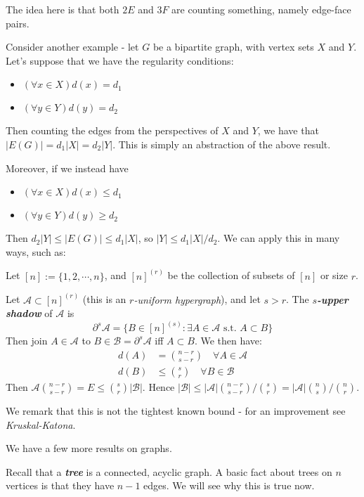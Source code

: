 \documentclass[]{article}
\theoremstyle{custhm}
\theoremstyle{cusdef}
\theoremstyle{custhm}
\theoremstyle{custhm}
\theoremstyle{custhm}
\theoremstyle{custhm}
\theoremstyle{cusdef}
\theoremstyle{remark}
\theoremstyle{custhm}
\newcommand{\undf}[1]{\textit{\textbf{#1}}}
\renewcommand{\it}[1]{\textit{#1}}
\begin{document}
The idea here is that both $2E$ and $3F$ are counting something, namely edge-face pairs.

Consider another example - let $G$ be a bipartite graph, with vertex sets $X$ and $Y$. Let's suppose that we have the regularity conditions:
\begin{itemize}
	\item $(\forall x\in X)d(x) = d_1$
	\item $(\forall y\in Y)d(y) = d_2$
\end{itemize}

Then counting the edges from the perspectives of $X$ and $Y$, we have that $|E(G)| = d_1|X| = d_2|Y|$. This is simply an abstraction of the above result.

Moreover, if we instead have
\begin{itemize}
	\item $(\forall x\in X)d(x) \le d_1$
	\item $(\forall y\in Y)d(y) \ge d_2$
\end{itemize}

Then $d_2|Y| \le |E(G)| \le d_1|X|$, so $|Y| \le d_1|X|/d_2$. We can apply this in many ways, such as:

Let $[n] := \{1,2,\cdots,n\}$, and $[n]^{(r)}$ be the collection of subsets of $[n]$ or size $r$.

Let $\mathcal{A} \subset [n]^{(r)}$ (this is an \it{$r$-uniform hypergraph}), and let $s > r$. The \undf{$s$-upper shadow} of $\mathcal{A}$ is
\[
\partial^s\mathcal{A} = \{B\in[n]^{(s)}: \exists A\in \mathcal{A} \textrm{ s.t. } A\subset B\}
\]
Then join $A\in \mathcal{A}$ to $B\in \mathcal{B} = \partial^s\mathcal{A}$ iff $A\subset B$. We then have:
\begin{align*}
	d(A) &= {n-r \choose s-r}\quad \forall A\in \mathcal{A}\\
	d(B) &\le {s \choose r}\quad \forall B\in \mathcal{B}
\end{align*}
Then $\mathcal{A} {n-r \choose s-r} = E \le {s \choose r}|\mathcal{B}|$. Hence $|\mathcal{B}| \le |\mathcal{A}|{n-r \choose s-r}/{s \choose r} = |\mathcal{A}| {n \choose s}/{n \choose r}$.

We remark that this is not the tightest known bound - for an improvement see \it{Kruskal-Katona}.

We have a few more results on graphs.

Recall that a \undf{tree} is a connected, acyclic graph. A basic fact about trees on $n$ vertices is that they have $n-1$ edges. We will see why this is true now.
\end{document}
